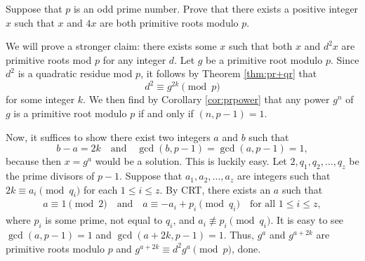 \documentclass{subfile}
\begin{document}
	\begin{problem}
		Suppose that $p$ is an odd prime number. Prove that there exists a positive integer $x$ such that $x$ and $4x$ are both primitive roots modulo $p$.
	\end{problem}
	
	\begin{solution}
		We will prove a stronger claim: there exists some $x$ such that both $x$ and $d^2x$ are primitive roots mod $p$ for any integer $d$. Let $g$ be a primitive root modulo $p$. Since $d^2$ is a quadratic residue mod $p$, it follows by Theorem \ref{thm:pr+qr} that $$d^2 \equiv g^{2k} \pmod{p}$$ for some integer $k$. We then find by Corollary \ref{cor:prpower} that any power $g^n$ of $g$ is a primitive root modulo $p$ if and only if $(n, p-1)=1$.
		
		Now, it suffices to show there exist two integers $a$ and $b$ such that $$b-a = 2k \quad \text{and} \quad \gcd(b,p-1) = \gcd(a,p-1) = 1,$$ because then $x=g^a$ would be a solution.
		This is luckily easy. Let $2,q_1,q_2,\ldots,q_z$ be the prime divisors of $p-1$. Suppose that $a_1,a_2,\ldots,a_z$ are integers such that $2k \equiv a_i \pmod{q_i}$ for each $1 \le i \le z$.
		By CRT, there exists an $a$ such that 
			\begin{align*}
				a \equiv 1 \pmod{2} \quad \text{and} \quad a \equiv -a_i + p_i \pmod{q_i}\quad \text{for all } 1 \le i \le z,
			\end{align*}
		where $p_i$ is some prime, not equal to $q_i$, and $a_i \not \equiv p_i \pmod{q_i}$. It is easy to see $\gcd(a,p-1) = 1$ and $\gcd(a+2k, p-1) = 1$. Thus, $g^a$ and $g^{a+2k}$ are primitive roots modulo $p$ and $g^{a+2k} \equiv d^2g^a \pmod{p}$, done.
	\end{solution}
	
\end{document}
